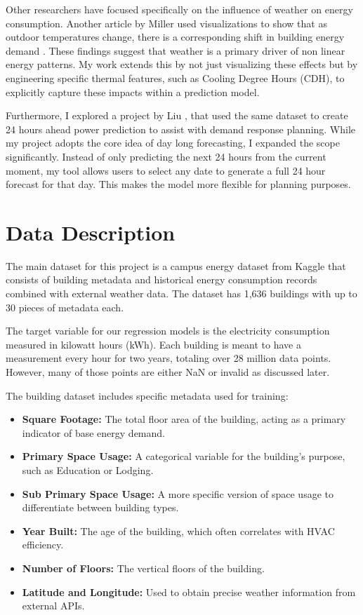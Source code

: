 \documentclass[conference]{IEEEtran}
\begin{document}
Other researchers have focused specifically on the influence of weather on energy consumption. Another article by Miller used visualizations to show that as outdoor temperatures change, there is a corresponding shift in building energy demand \cite{miller_weather}. These findings suggest that weather is a primary driver of non linear energy patterns. My work extends this by not just visualizing these effects but by engineering specific thermal features, such as Cooling Degree Hours (CDH), to explicitly capture these impacts within a prediction model.

Furthermore, I explored a project by Liu \cite{liu_prediction}, that used the same dataset to create 24 hours ahead power prediction to assist with demand response planning. While my project adopts the core idea of day long forecasting, I expanded the scope significantly. Instead of only predicting the next 24 hours from the current moment, my tool allows users to select any date to generate a full 24 hour forecast for that day. This makes the model more flexible for planning purposes.





\section{Data Description}
The main dataset for this project is a campus energy dataset from Kaggle that consists of building metadata and historical energy consumption records combined with external weather data. The dataset has 1,636 buildings with up to 30 pieces of metadata each.

The target variable for our regression models is the electricity consumption measured in kilowatt hours (kWh). Each building is meant to have a measurement every hour for two years, totaling over 28 million data points. However, many of those points are either NaN or invalid as discussed later.

The building dataset includes specific metadata used for training:
\begin{itemize}
\item \textbf{Square Footage:} The total floor area of the building, acting as a primary indicator of base energy demand.
\item \textbf{Primary Space Usage:} A categorical variable for the building's purpose, such as Education or Lodging.
\item \textbf{Sub Primary Space Usage:} A more specific version of space usage to differentiate between building types.
\item \textbf{Year Built:} The age of the building, which often correlates with HVAC efficiency.
\item \textbf{Number of Floors:} The vertical floors of the building.
\item \textbf{Latitude and Longitude:} Used to obtain precise weather information from external APIs.
\end{itemize}
\end{document}
